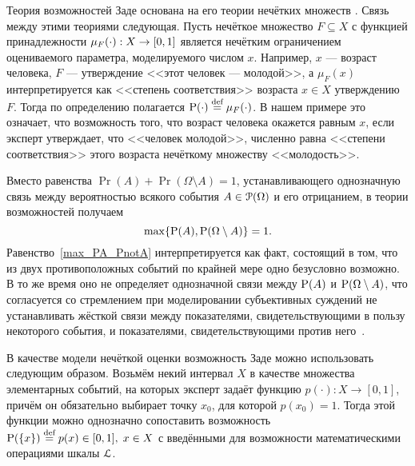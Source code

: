 \begin{notice}
Теория возможностей Заде основана на его теории нечётких множеств \cite{ZadehPrime}. Связь между этими теориями следующая. Пусть нечёткое множество $F \subseteq X$ с функцией принадлежности $\mu_{F}(\cdot): X \rightarrow \zo$ является нечётким ограничением \cite{citeZadeh} оцениваемого параметра, моделируемого числом $x$. Например, $x$ --- возраст человека, $F$ --- утверждение <<этот человек --- молодой>>, а $\mu_{F}(x)$ интерпретируется как <<степень соответствия>> возраста $x \in X$ утверждению $F$. Тогда по определению полагается $\P(\cdot) \defeq \mu_{F}(\cdot)$. В нашем примере это означает, что возможность того, что возраст человека окажется равным $x$, если эксперт утверждает, что <<человек молодой>>, численно равна <<степени соответствия>> этого возраста нечёткому множеству <<молодость>>. 
\end{notice}
\begin{notice}
Вместо равенства $\Pr(A) + \Pr(\Omega\setminus A) = 1$, устанавливающего однозначную связь между вероятностью всякого события $A\in\Po(\Omega)$ и его отрицанием, в теории возможностей получаем
\begin{equation}
\label{max_PA_PnotA}
    \max\{\P(A), \P(\Omega\setminus A)\} = 1.
\end{equation}
Равенство~\eqref{max_PA_PnotA} интерпретируется как факт, состоящий в том, что из двух противоположных событий по крайней мере одно безусловно возможно. В то же время оно не определяет однозначной связи между $\P(A)$ и $\P(\Omega\setminus A)$, что согласуется со стремлением при моделировании субъективных суждений не устанавливать жёсткой связи между показателями, свидетельствующими в пользу некоторого события, и показателями, свидетельствующими против него~\cite{dubois_prade-1990}.
\end{notice}

\label{zadeh_fuzzy_asset_alg}
В качестве модели нечёткой оценки возможность Заде можно использовать следующим образом. Возьмём некий интервал $X$ в качестве множества элементарных событий, на которых эксперт задаёт функцию $p(\cdot): X \rightarrow [0,1]$, причём он обязательно выбирает точку $x_0$, для которой $p(x_0) = 1$. Тогда этой функции можно однозначно сопоставить возможность $\P(\{x\}) \define= p(x) \in \zo,\; x\in X$ с введёнными для возможности математическими операциями шкалы $\scL$. 

